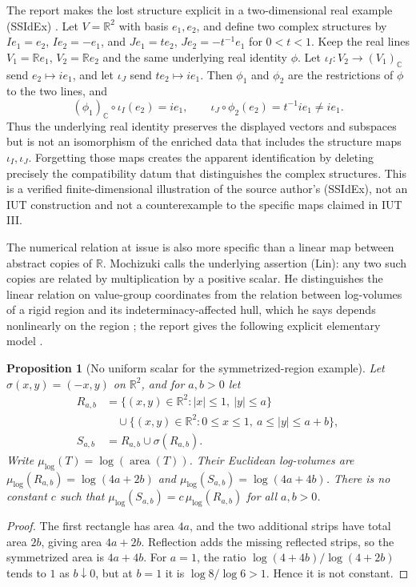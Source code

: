 \documentclass[11pt]{article}
\newtheorem{proposition}[theorem]{Proposition}
\begin{document}
The report makes the lost structure explicit in a two-dimensional real example (SSIdEx) \cite[Section 10, pp.~17--19]{MochizukiReport2018}. Let $V=\mathbb R^2$ with basis $e_1,e_2$, and define two complex structures by $I e_1=e_2$, $I e_2=-e_1$, and $J e_1=t e_2$, $J e_2=-t^{-1}e_1$ for $0<t<1$. Keep the real lines $V_1=\mathbb R e_1$, $V_2=\mathbb R e_2$ and the same underlying real identity $\phi$. Let $\iota_I:V_2\to(V_1)_{\mathbb C}$ send $e_2\mapsto i e_1$, and let $\iota_J$ send $t e_2\mapsto i e_1$. Then $\phi_1$ and $\phi_2$ are the restrictions of $\phi$ to the two lines, and
\[
(\phi_1)_{\mathbb C}\circ\iota_I(e_2)=i e_1,\qquad \iota_J\circ\phi_2(e_2)=t^{-1}i e_1\ne i e_1.
\]
Thus the underlying real identity preserves the displayed vectors and subspaces but is not an isomorphism of the enriched data that includes the structure maps $\iota_I,\iota_J$. Forgetting those maps creates the apparent identification by deleting precisely the compatibility datum that distinguishes the complex structures. This is a verified finite-dimensional illustration of the source author's (SSIdEx), not an IUT construction and not a counterexample to the specific maps claimed in IUT III.

The numerical relation at issue is also more specific than a linear map between abstract copies of $\mathbb R$. Mochizuki calls the underlying assertion (Lin): any two such copies are related by multiplication by a positive scalar. He distinguishes the linear relation on value-group coordinates from the relation between log-volumes of a rigid region and its indeterminacy-affected hull, which he says depends nonlinearly on the region \cite[(C14), p.~4]{MochizukiResponse}; the report gives the following explicit elementary model \cite[Section 12, LVEx, pp.~24--26]{MochizukiReport2018}.

\begin{proposition}[No uniform scalar for the symmetrized-region example]\label{prop:no-uniform-volume-scalar}
Let $\sigma(x,y)=(-x,y)$ on $\mathbb R^2$, and for $a,b>0$ let
\[
\begin{aligned}
R_{a,b}&=\{(x,y)\in\mathbb R^2: |x|\leq1,\ |y|\leq a\}\\
&\quad\cup\{(x,y)\in\mathbb R^2: 0\leq x\leq1,\ a\leq|y|\leq a+b\},\\
S_{a,b}&=R_{a,b}\cup\sigma(R_{a,b}).
\end{aligned}
\]
Write $\mu_{\log}(T)=\log(\operatorname{area}(T))$. Their Euclidean log-volumes are $\mu_{\log}(R_{a,b})=\log(4a+2b)$ and $\mu_{\log}(S_{a,b})=\log(4a+4b)$. There is no constant $c$ such that $\mu_{\log}(S_{a,b})=c\,\mu_{\log}(R_{a,b})$ for all $a,b>0$.
\end{proposition}
\begin{proof}
The first rectangle has area $4a$, and the two additional strips have total area $2b$, giving area $4a+2b$. Reflection adds the missing reflected strips, so the symmetrized area is $4a+4b$. For $a=1$, the ratio $\log(4+4b)/\log(4+2b)$ tends to $1$ as $b\downarrow0$, but at $b=1$ it is $\log 8/\log 6>1$. Hence it is not constant.
\end{proof}
\end{document}
